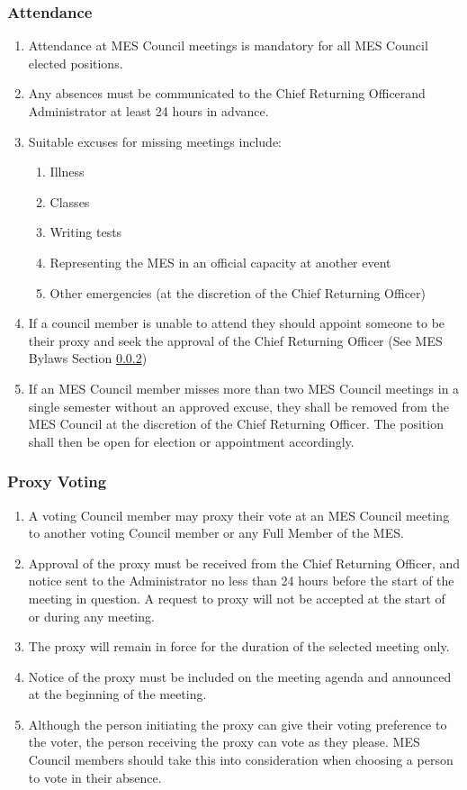 \subsubsection{Attendance}
\label{attendance}
\begin{enumerate}
 \item
  Attendance at MES Council meetings is mandatory for all MES Council
  elected positions.
 \item
  Any absences must be communicated to the Chief Returning Officerand
  Administrator at least 24 hours in advance.
 \item
  Suitable excuses for missing meetings include:

  \begin{enumerate}
   \item
    Illness
   \item
    Classes
   \item
    Writing tests
   \item
    Representing the MES in an official capacity at another event
   \item
    Other emergencies (at the discretion of the Chief Returning Officer)
  \end{enumerate}
 \item
  If a council member is unable to attend they should appoint someone to
  be their proxy and seek the approval of the Chief Returning Officer
  (See MES Bylaws Section \ref{proxy-voting})
 \item
  If an MES Council member misses more than two MES Council meetings in
  a single semester without an approved excuse, they shall be removed
  from the MES Council at the discretion of the Chief Returning Officer.
  The position shall then be open for election or appointment
  accordingly.
\end{enumerate}

\subsubsection{Proxy Voting}
\label{proxy-voting}
\begin{enumerate}
 \item
  A voting Council member may proxy their vote at an MES Council meeting
  to another voting Council member or any Full Member of the MES.
 \item
  Approval of the proxy must be received from the Chief Returning
  Officer, and notice sent to the Administrator no less than 24 hours
  before the start of the meeting in question. A request to proxy will
  not be accepted at the start of or during any meeting.
 \item
  The proxy will remain in force for the duration of the selected
  meeting only.
 \item
  Notice of the proxy must be included on the meeting agenda and
  announced at the beginning of the meeting.
 \item
  Although the person initiating the proxy can give their voting
  preference to the voter, the person receiving the proxy can vote as
  they please. MES Council members should take this into consideration
  when choosing a person to vote in their absence.
\end{enumerate}

